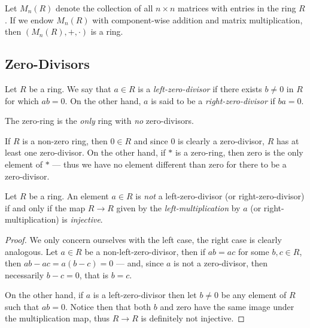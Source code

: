 %
\begin{example}
    \label{exp:square-matrices-ring}
    Let \(M_n(R)\) denote the collection of all \(n \times n\) matrices with entries
    in the ring \(R\). If we endow \(M_n(R)\) with component-wise addition and matrix
    multiplication, then \((M_n(R), +, \cdot)\) is a ring.
\end{example}
%

\subsection{Zero-Divisors}

%
\begin{definition}
    \label{def:zero-divisor}
    Let \(R\) be a ring. We say that \(a \in R\) is a \emph{left-zero-divisor} if
    there exists \(b \neq 0\) in \(R\) for which \(a b = 0\). On the other hand,
    \(a\) is said to be a \emph{right-zero-divisor} if \(b a = 0\).
\end{definition}
%

%
\begin{remark}
    \label{rem:zero-ring-only-no-zero-divisors}
    The zero-ring is the \emph{only} ring with \emph{no} zero-divisors.

    If \(R\) is a non-zero ring, then \(0 \in R\) and since \(0\) is clearly a
    zero-divisor, \(R\) has at least one zero-divisor. On the other hand, if \(*\)
    is a zero-ring, then zero is the only element of \(*\) --- thus we have no
    element different than zero for there to be a zero-divisor.
\end{remark}
%

%
\begin{proposition}
    \label{prop:no-zero-divisor-injective-multiplication}
    Let \(R\) be a ring. An element \(a \in R\) is \emph{not} a left-zero-divisor
    (or right-zero-divisor) if and only if the map \(R \to R\) given by the
    \emph{left-multiplication} by \(a\) (or right-multiplication) is
    \emph{injective}.
\end{proposition}
%

%
\begin{proof}
    We only concern ourselves with the left case, the right case is clearly
    analogous. Let \(a \in R\) be a non-left-zero-divisor, then if \(a b = a c\) for
    some \(b, c \in R\), then \(a b - a c = a (b - c) = 0\) --- and, since \(a\) is
    not a zero-divisor, then necessarily \(b - c = 0\), that is \(b = c\).

    On the other hand, if \(a\) is a left-zero-divisor then let \(b \neq 0\) be any
    element of \(R\) such that \(a b = 0\). Notice then that both \(b\) and zero
    have the same image under the multiplication map, thus \(R \to R\) is definitely
    not injective.
\end{proof}
%

